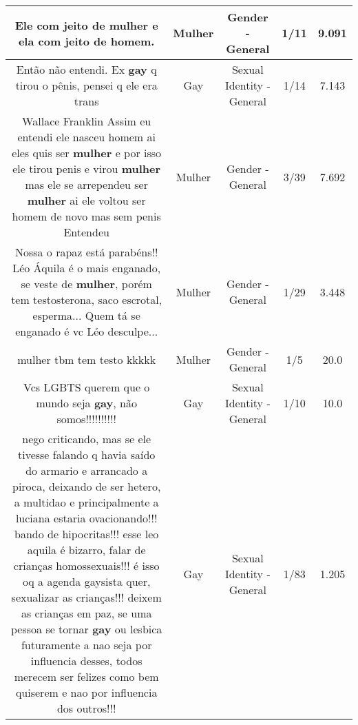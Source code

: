 \documentclass[11pt]{article}
\newlength\mylength
\begin{document}
\begin{center}
\begin{longtable}{|C{.65\mylength}|C{.30\mylength}|C{.12\mylength}|C{.12\mylength}|C{.12\mylength}|}
  \small Ele com jeito de \textbf{mulher} e ela com jeito de homem.\normalsize   & Mulher & Gender - General & 1/11 & 9.091 \\  \hline
  \small Então não entendi.  Ex \textbf{gay} q tirou o pênis, pensei q ele era trans\normalsize   & Gay & Sexual Identity - General & 1/14 & 7.143 \\  \hline
  \small Wallace Franklin Assim eu entendi ele nasceu homem ai eles quis ser \textbf{mulher} e por isso ele tirou penis e virou \textbf{mulher} mas ele se arrependeu ser \textbf{mulher} ai ele voltou ser homem de novo mas sem penis Entendeu\normalsize   & Mulher & Gender - General & 3/39 & 7.692 \\  \hline
  \small Nossa o rapaz está parabéns!! Léo Áquila é o mais enganado, se veste de \textbf{mulher}, porém tem testosterona, saco escrotal, esperma... Quem tá se enganado é vc Léo desculpe...\normalsize   & Mulher & Gender - General & 1/29 & 3.448 \\  \hline
  \small mulher tbm tem testo kkkkk\normalsize   & Mulher & Gender - General & 1/5 & 20.0 \\  \hline
  \small Vcs LGBTS querem que o mundo seja \textbf{gay}, não somos!!!!!!!!!!\normalsize   & Gay & Sexual Identity - General & 1/10 & 10.0 \\  \hline
  \small nego criticando, mas se ele tivesse falando q havia saído do armario e arrancado a piroca, deixando de ser hetero, a multidao e principalmente a luciana estaria ovacionando!!! bando de hipocritas!!! esse leo aquila é bizarro, falar de crianças homossexuais!!! é isso oq a agenda gaysista quer, sexualizar as crianças!!! deixem as crianças em paz, se uma pessoa se tornar \textbf{gay} ou lesbica futuramente a nao seja por influencia desses, todos merecem ser felizes como bem quiserem e nao por influencia dos outros!!!\normalsize   & Gay & Sexual Identity - General & 1/83 & 1.205 \\  \hline

\end{longtable}
\end{center}
\end{document}
